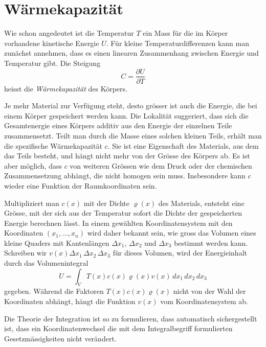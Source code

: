 %
%
%

%
%
\section{Wärmekapazität
\label{buch:fallstudie:waermekapazitaet}}
Wie schon angedeutet ist die Temperatur $T$ ein Mass für die im Körper
vorhandene kinetische Energie $U$.
Für kleine Temperaturdifferenzen kann man zunächst annehmen, dass
es einen linearen Zusammenhang zwischen Energie und Temperatur gibt.
Die Steigung 
\[
C
=
\frac{\partial U}{\partial T}
\]
heisst die {\em Wärmekapazität} des Körpers.

Je mehr Material zur Verfügung steht, desto grösser ist auch die Energie,
die bei einem Körper gespeichert werden kann.
Die Lokalität suggeriert, dass sich die Gesamtenergie eines Körpers 
additiv aus den Energie der einzelnen Teile zusammensetzt.
Teilt man durch die Masse eines solchen kleinen Teils, erhält man die
spezifische Wärmekapazität $c$.
Sie ist eine Eigenschaft des Materials, aus dem das Teils besteht,
und hängt nicht mehr von der Grösse des Körpers ab.
Es ist aber möglich, dass $c$ von weiteren Grössen wie dem Druck oder der
chemischen Zusammensetzung abhängt, die nicht homogen sein muss.
Insbesondere kann $c$ wieder eine Funktion der Raumkoordinaten sein.

Multipliziert man $c(x)$ mit der Dichte $\varrho(x)$ des Materials,
entsteht eine Grösse, mit der sich aus der Temperatur sofort die
Dichte der gespeicherten Energie berechnen lässt.
In einem gewählten Koordinatensystem mit den Koordinaten $(x_1,\dots,x_n)$
wird daher bekannt sein, wie gross das Volumen eines kleine
Quaders mit Kantenlängen $\Delta x_1$, $\Delta x_2$ und $\Delta x_3$ 
bestimmt werden kann.
Schreiben wir $v(x) \Delta x_1\,\Delta x_2\,\Delta x_3$ für dieses 
Volumen, wird der Energieinhalt durch das Volumenintegral
\[
U
=
\int_V T(x) c(x)\varrho(x) v(x)\,dx_1\,dx_2\,dx_3
\]
gegeben.
Während die Faktoren $T(x) c(x) \varrho(x)$ nicht von der Wahl der
Koordinaten abhängt, hängt die Funktion $v(x)$ vom Koordinatensystem
ab.

\begin{aufgabe}
Die Theorie der Integration ist so zu formulieren, dass automatisch
sichergestellt ist, dass ein Koordinatenwechsel die mit dem Integralbegriff
formulierten Gesetzmässigkeiten nicht verändert.
\end{aufgabe}

